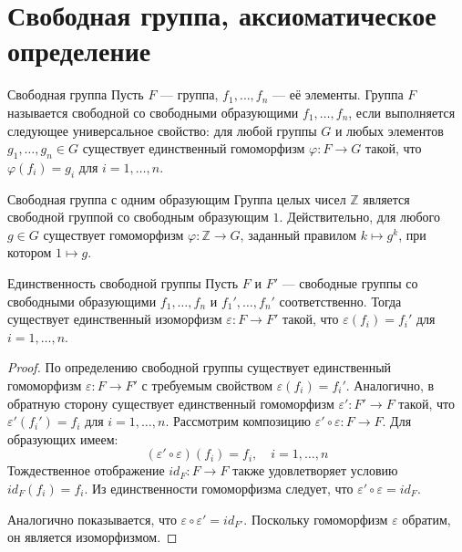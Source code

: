 
\section{Свободная группа, аксиоматическое определение}

\begin{Definition}{Свободная группа}{}
	Пусть $F$ — группа, $f_1, \dots, f_n$ — её элементы.
	Группа $F$ называется свободной со свободными образующими $f_1, \dots, f_n$, если выполняется следующее универсальное свойство: для любой группы $G$ и любых элементов $g_1, \dots, g_n \in G$ существует единственный гомоморфизм $\varphi: F \to G$ такой, что $\varphi(f_i) = g_i$ для $i = 1, \dots, n$.
\end{Definition}

\begin{Example}{Свободная группа с одним образующим}{}
	Группа целых чисел $\mathbb{Z}$ является свободной группой со свободным образующим $1$.
	Действительно, для любого $g \in G$ существует гомоморфизм $\varphi: \mathbb{Z} \to G$, заданный правилом $k \mapsto g^k$, при котором $1 \mapsto g$.
\end{Example}

\begin{Proposition}{Единственность свободной группы}{}
	Пусть $F$ и $F'$ — свободные группы со свободными образующими $f_1, \dots, f_n$ и $f_1', \dots, f_n'$ соответственно.
	Тогда существует единственный изоморфизм $\varepsilon: F \to F'$ такой, что $\varepsilon(f_i) = f_i'$ для $i = 1, \dots, n$.
\end{Proposition}

\begin{proof}
	По определению свободной группы существует единственный гомоморфизм $\varepsilon: F \to F'$ с требуемым свойством $\varepsilon(f_i) = f_i'$.
	Аналогично, в обратную сторону существует единственный гомоморфизм $\varepsilon': F' \to F$ такой, что $\varepsilon'(f_i') = f_i$ для $i = 1, \dots, n$.
	Рассмотрим композицию $\varepsilon' \circ \varepsilon: F \to F$. Для образующих имеем:
	\[ (\varepsilon' \circ \varepsilon)(f_i) = f_i, \quad i = 1, \dots, n \]
	Тождественное отображение $id_F: F \to F$ также удовлетворяет условию $id_F(f_i) = f_i$.
	Из единственности гомоморфизма следует, что $\varepsilon' \circ \varepsilon = id_F$.

	Аналогично показывается, что $\varepsilon \circ \varepsilon' = id_{F'}$.
	Поскольку гомоморфизм $\varepsilon$ обратим, он является изоморфизмом.
\end{proof}

